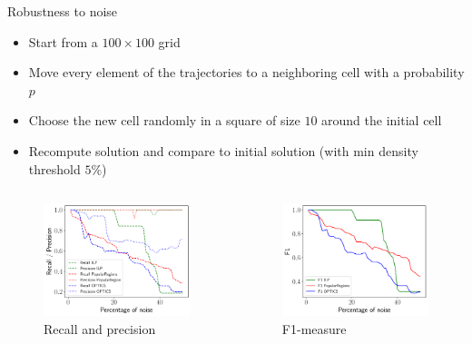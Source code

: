 \documentclass[10pt]{beamer}
\begin{document}
\begin{frame}{Robustness to noise}
    \begin{itemize}
        \item Start from a $100 \times 100$ grid
        \item Move every element of the trajectories to a neighboring cell with a probability $p$
        \item Choose the new cell randomly in a square of size $10$ around the initial cell
        \item Recompute solution and compare to initial solution (with min density threshold $5\%$)
    \end{itemize}
    \begin{columns}[T, onlytextwidth]

        \begin{figure}
            \centering
            \includegraphics[scale=0.3]{figures/results/recall-precision.pdf}
            \caption{Recall and precision}
        \end{figure}

        \begin{figure}
            \centering
            \includegraphics[scale=0.3]{figures/results/f1.pdf}
            \caption{F1-measure}
        \end{figure}
    \end{columns}
\end{frame}
\end{document}
